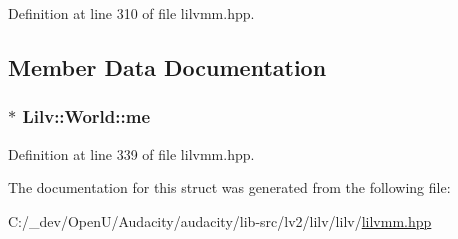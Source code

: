 Definition at line 310 of file lilvmm.\+hpp.



\subsection{Member Data Documentation}
\subsubsection[{\texorpdfstring{me}{me}}]{$\ast$ Lilv\+::\+World\+::me}\hypertarget{struct_lilv_1_1_world_a3a9b29f08e1dc76539142e90e3d29f81}{}\label{struct_lilv_1_1_world_a3a9b29f08e1dc76539142e90e3d29f81}


Definition at line 339 of file lilvmm.\+hpp.



The documentation for this struct was generated from the following file\+:\begin{DoxyCompactItemize}
\item 
C\+:/\+\_\+dev/\+Open\+U/\+Audacity/audacity/lib-\/src/lv2/lilv/lilv/\hyperlink{lilvmm_8hpp}{lilvmm.\+hpp}\end{DoxyCompactItemize}
